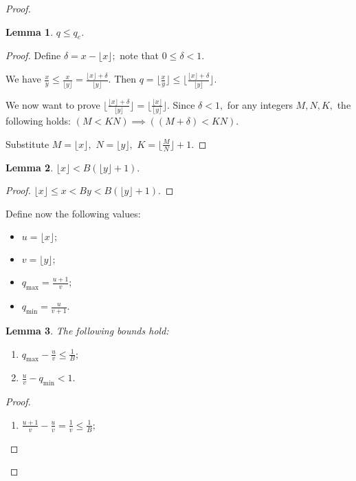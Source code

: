 \documentclass[a4paper,12pt]{article}
\newtheorem{lemma}{Lemma}
\newcommand{\floor}[1] {\lfloor #1 \rfloor}
\begin{document}
\begin{proof}
    \begin{lemma}
        $q \le q_e.$
    \end{lemma}
    \begin{proof}
        Define $\delta = x - \floor{x};$
        note that $0 \le \delta < 1.$

        We have $\frac{x}{y} \le \frac{x}{\floor{y}} = \frac{\floor{x} + \delta}{\floor{y}}.$
        Then $q = \floor{\frac{x}{y}} \le \floor{\frac{\floor{x} + \delta}{\floor{y}}}.$

        We now want to prove $\floor{\frac{\floor{x} + \delta}{\floor{y}}} = \floor{\frac{\floor x}{\floor y}}.$
        Since $\delta < 1,$ for any integers $M, N, K,$ the following holds: $(M < KN) \implies ((M + \delta) < KN).$

        Substitute $M = \floor{x},$ $N = \floor{y},$ $K = \floor{\frac{M}{N}} + 1.$
    \end{proof}

    \begin{lemma}
    \label{lemma:floorx_bound}
        $\floor{x} < B (\floor{y} + 1).$
    \end{lemma}
    \begin{proof}
        $\floor{x} \le x < By < B(\floor{y} + 1).$
    \end{proof}

    Define now the following values:
    \begin{itemize}
        \item $u = \floor{x};$
        \item $v = \floor{y};$
        \item $q_{\max} = \frac{u+1}{v};$
        \item $q_{\min} = \frac{u}{v+1}.$
    \end{itemize}

    \begin{lemma}
    \label{lemma:bounds}
        The following bounds hold:
        \begin{enumerate}
            \item $q_{\max} - \frac{u}{v} \le \frac{1}{B};$
            \item $\frac{u}{v} - q_{\min} < 1.$
        \end{enumerate}
    \end{lemma}
    \begin{proof}
        \begin{enumerate}
            \item $\frac{u+1}{v} - \frac{u}{v} = \frac{1}{v} \le \frac{1}{B};$


\end{enumerate}
\end{proof}
\end{proof}
\end{document}
